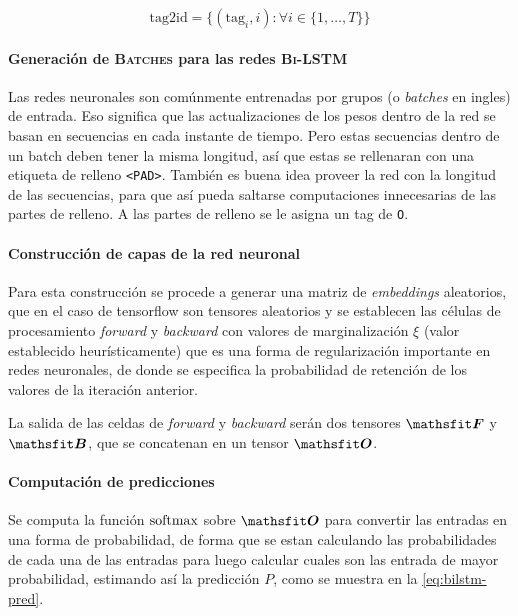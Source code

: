 \begin{equation} \label{eq:lstm-tag2id}
  \text{tag2id} = \Big\{(\text{tag}_i, i) : \forall i \in \{1, \ldots, T\} \Big\}
\end{equation}

\paragraph{Generación de \textsc{Batches} para las redes \textsc{Bi-LSTM}}
Las redes neuronales son comúnmente entrenadas por grupos (o \emph{batches} en ingles) de entrada. Eso significa que las actualizaciones de los pesos dentro de la red se basan en secuencias en cada instante de tiempo. Pero estas secuencias dentro de un batch deben tener la misma longitud, así que estas se rellenaran con una etiqueta de relleno \texttt{<PAD>}. También es buena idea proveer la red con la longitud de las secuencias, para que así pueda saltarse computaciones innecesarias de las partes de relleno. A las partes de relleno se le asigna un tag de \texttt{O}.

\paragraph{Construcción de capas de la red neuronal}
Para esta construcción se procede a generar una matriz de \emph{embeddings} aleatorios, que en el caso de \gls{tensorflow} son tensores aleatorios y se establecen las células de procesamiento \emph{forward} y \emph{backward} con valores de marginalización $\xi$ (valor establecido heurísticamente) que es una forma de regularización importante en redes neuronales, de donde se especifica la probabilidad de retención de los valores de la iteración anterior.

La salida de las celdas de \emph{forward} y \emph{backward} serán dos tensores $\tF$ y $\tB$, que se concatenan en un tensor $\tO$.

\paragraph{Computación de predicciones}
Se computa la función $\mathrm{softmax}$ sobre $\tO$ para convertir las entradas en una forma de probabilidad, de forma que se estan calculando las probabilidades de cada una de las entradas para luego calcular cuales son las entrada de mayor probabilidad, estimando así la predicción $P$, como se muestra en la \cref{eq:bilstm-pred}.

